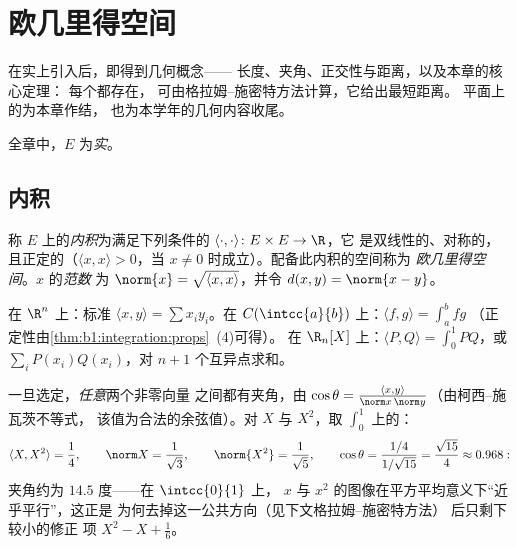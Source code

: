 \chapter{欧几里得空间}\label{ch:b1:euclid}

在实上引入后，即得到几何概念——
长度、夹角、正交性与距离，以及本章的核心定理：
每个都存在，
可由格拉姆–施密特方法计算，它给出最短距离。
平面上的为本章作结，
也为本学年的几何内容收尾。

全章中，$E$ 为\emph{实}。

\section{内积}

\begin{definition}\label{def:b1:euclid:def}
称 $E$ 上的\emph{内积}为满足下列条件的
$\langle\cdot,\cdot\rangle \colon E \times E \to \R$，它
是双线性的、对称的，且正定的（$\langle x, x\rangle >
0$，当 $x \neq 0$ 时成立）。配备此内积的空间称为
\emph{欧几里得空间}。$x$ 的\emph{范数}
为 $\norm{x} = \sqrt{\langle x, x\rangle}$，并令 $d(x, y) =
\norm{x - y}$。
\end{definition}

\begin{example}\label{ex:b1:euclid:examples}
在 $\R^n$ 上：标准 $\langle x, y\rangle = \sum x_i
y_i$。在 $C(\intcc{a}{b})$ 上：$\langle f, g \rangle = \int_a^b fg$
（正定性由\cref{thm:b1:integration:props}~(4)可得）。
在 $\R_n[X]$ 上：$\langle P, Q\rangle = \int_0^1 PQ$，或 $\sum_{i}
P(x_i)Q(x_i)$，对 $n+1$ 个互异点求和。
\end{example}

\begin{example}[两个多项式之间的夹角]
\label{ex:b1:euclid:polyangle}
一旦选定，\emph{任意}两个非零向量
之间都有夹角，由 $\cos\theta = \frac{\langle x,
y\rangle}{\norm x\,\norm y}$（由柯西–施瓦茨不等式，
该值为合法的余弦值）。对 $X$ 与 $X^2$，取 $\int_0^1$ 上的：
\[
\langle X, X^2\rangle = \frac14, \qquad
\norm X = \frac1{\sqrt3}, \qquad \norm{X^2} = \frac1{\sqrt5},
\qquad
\cos\theta = \frac{1/4}{1/\sqrt{15}} = \frac{\sqrt{15}}{4}
\approx 0.968 :
\]
夹角约为 $14.5$ 度——在 $\intcc{0}{1}$ 上，
$x$ 与 $x^2$ 的图像在平方平均意义下“近乎平行”，这正是
为何去掉这一公共方向（见下文格拉姆–施密特方法）
后只剩下较小的修正
项 $X^2 - X + \frac16$。
\end{example}

